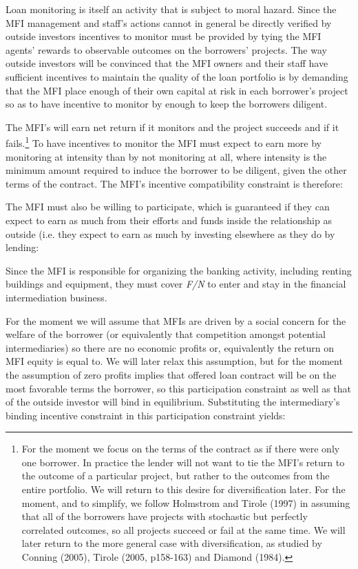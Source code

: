 \documentclass{article}
\begin{document}
Loan monitoring is itself an activity that is subject to moral hazard.
Since the MFI management and staff's actions cannot in general be
directly verified by outside investors incentives to monitor must be
provided by tying the MFI agents' rewards to observable outcomes on the
borrowers' projects. The way outside investors will be convinced that
the MFI owners and their staff have sufficient incentives to maintain
the quality of the loan portfolio is by demanding that the MFI place
enough of their own capital at risk in each borrower's project so as to
have incentive to monitor by enough to keep the borrowers diligent.

The MFI's will earn net return if it monitors and the project succeeds
and if it fails.\footnote{For the moment we focus on the terms of the
  contract as if there were only one borrower. In practice the lender
  will not want to tie the MFI's return to the outcome of a particular
  project, but rather to the outcomes from the entire portfolio. We will
  return to this desire for diversification later. For the moment, and
  to simplify, we follow Holmstrom and Tirole (1997) in assuming that
  all of the borrowers have projects with stochastic but perfectly
  correlated outcomes, so all projects succeed or fail at the same time.
  We will later return to the more general case with diversification, as
  studied by Conning (2005), Tirole (2005, p158-163) and Diamond (1984).}
To have incentives to monitor the MFI must expect to earn more by
monitoring at intensity than by not monitoring at all, where intensity
is the minimum amount required to induce the borrower to be diligent,
given the other terms of the contract. The MFI's incentive compatibility
constraint is therefore:


The MFI must also be willing to participate, which is guaranteed if they
can expect to earn as much from their efforts and funds inside the
relationship as outside (i.e. they expect to earn as much by investing
elsewhere as they do by lending:


Since the MFI is responsible for organizing the banking activity,
including renting buildings and equipment, they must cover \emph{F/N} to
enter and stay in the financial intermediation business.

For the moment we will assume that MFIs are driven by a social concern
for the welfare of the borrower (or equivalently that competition
amongst potential intermediaries) so there are no economic profits or,
equivalently the return on MFI equity is equal to. We will later relax
this assumption, but for the moment the assumption of zero profits
implies that offered loan contract will be on the most favorable terms
the borrower, so this participation constraint as well as that of the
outside investor will bind in equilibrium. Substituting the
intermediary's binding incentive constraint in this participation
constraint yields:
\end{document}
